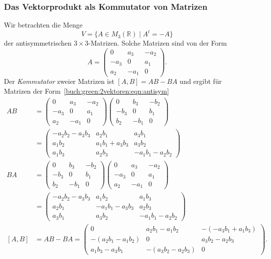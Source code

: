 \subsubsection{Das Vektorprodukt als Kommutator von Matrizen}
Wir betrachten die Menge 
\[
V
=
\{ A\in M_3(\mathbb{R}) \mid A^t=-A\}
\]
der antisymmetrischen $3\times 3$-Matrizen.
Solche Matrizen sind von der Form
\begin{equation}
A
=
\begin{pmatrix}
  0  &  a_3 & -a_2 \\
-a_3 &   0  &  a_1 \\
 a_2 & -a_1 &   0
\end{pmatrix}.
\label{buch:green:2vektoren:eqn:antisym}
\end{equation}
Der {\em Kommutator} zweier Matrizen ist $[A,B]=AB-BA$ und ergibt
für Matrizen der Form~\eqref{buch:green:2vektoren:eqn:antisym}
\begin{align*}
AB
&=
\begin{pmatrix}
  0  &  a_3 & -a_2 \\
-a_3 &   0  &  a_1 \\
 a_2 & -a_1 &   0
\end{pmatrix}
\begin{pmatrix}
  0  &  b_3 & -b_2 \\
-b_3 &   0  &  b_1 \\
 b_2 & -b_1 &   0
\end{pmatrix}
\\
&=
\begin{pmatrix}
-a_2b_2-a_3b_3 &     a_2b_1     & a_3b_1         \\
 a_1b_2        & a_1b_1+a_3b_3  & a_3b_2         \\
 a_1b_3        &     a_2b_3     & -a_1b_1-a_2b_2 
\end{pmatrix}
\\
BA
&=
\begin{pmatrix}
  0  &  b_3 & -b_2 \\
-b_3 &   0  &  b_1 \\
 b_2 & -b_1 &   0
\end{pmatrix}
\begin{pmatrix}
  0  &  a_3 & -a_2 \\
-a_3 &   0  &  a_1 \\
 a_2 & -a_1 &   0
\end{pmatrix}
\\
&=
\begin{pmatrix}
-a_2b_2-a_3b_3  &      a_1b_2    &    a_1b_3     \\
     a_2b_1     & -a_1b_1-a_3b_3 &    a_2b_3     \\
     a_3b_1     &      a_3b_2    & -a_1b_1-a_2b_2
\end{pmatrix}
\\
[A,B]
&=
AB-BA
=
\begin{pmatrix}
        0        &   a_2b_1-a_1b_2  & -(-a_3b_1+a_1b_3) \\
-(a_2b_1-a_1b_2) &         0        &    a_3b_2-a_2b_3  \\
  a_1b_3-a_3b_1  & -(a_3b_2-a_2b_3) &          0
\end{pmatrix}.
\end{align*}
